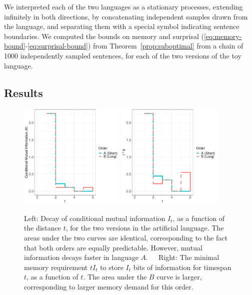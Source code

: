 We interpreted each of the two languages as a stationary processes, extending infinitely in both directions, by concatenating independent samples drawn from the language, and separating them with a special symbol indicating sentence boundaries.
We computed the bounds on memory and surprisal (\ref{eq:memory-bound}-\ref{eq:surprisal-bound}) from Theorem~\ref{prop:suboptimal} from a chain of 1000 independently sampled sentences, for each of the two versions of the toy language.

\subsection{Results}	

\begin{figure}
\centering
\includegraphics[width=0.45\textwidth]{figures/toy-mis.pdf}
\includegraphics[width=0.45\textwidth]{figures/toy-t-mis.pdf}
%
	\caption{Left: Decay of conditional mutual information $I_t$, as a function of the distance $t$, for the two versions in the artificial language. The areas under the two curves are identical, corresponding to the fact that both orders are equally predictable. However, mutual information decays faster in language $A$.\ \ \ Right: The minimal memory requirement $t I_t$ to store $I_t$ bits of information for timespan $t$, as a function of $t$. The area under the $B$ curve is larger, corresponding to larger memory demand for this order.}\label{fig:toy-mis}
\end{figure}

